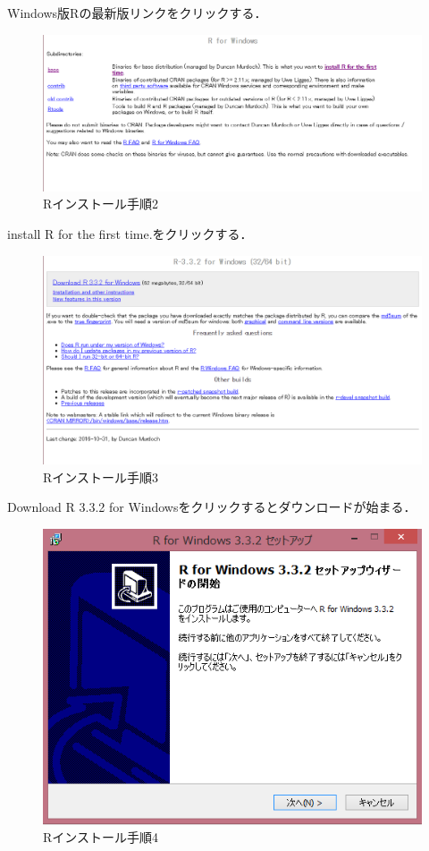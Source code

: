 Windows版Rの最新版リンクをクリックする．

\newpage

\begin{figure}[H]
\centering
\includegraphics[width=12cm]{R2.PNG}
\caption{Rインストール手順2}\label{サンプル図}
\end{figure}

install R for the first time.をクリックする．

\begin{figure}[H]
\centering
\includegraphics[width=12cm]{R3.PNG}
\caption{Rインストール手順3}\label{サンプル図}
\end{figure}

Download R 3.3.2 for Windowsをクリックするとダウンロードが始まる．

\newpage

\begin{figure}[H]
\centering
\includegraphics[width=12cm]{R4.PNG}
\caption{Rインストール手順4}\label{サンプル図}
\end{figure}

